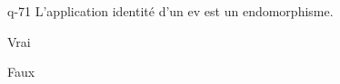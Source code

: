 \begin{truefalse}{q-71}
L'application identité d'un ev est un endomorphisme.
\item* Vrai
\item Faux
\end{truefalse}


